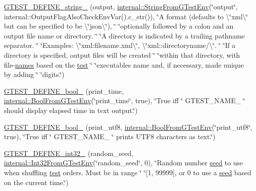 \begin{DoxyCompactItemize}
\mbox{\hyperlink{namespacetesting_a540064257c7d8030f84b886bc519aaf8}{G\+T\+E\+S\+T\+\_\+\+D\+E\+F\+I\+N\+E\+\_\+string\+\_\+}} (output, \mbox{\hyperlink{namespacetesting_1_1internal_a7ed785df46a339403b0f749d3a879201}{internal\+::\+String\+From\+G\+Test\+Env}}(\char`\"{}output\char`\"{}, internal\+::\+Output\+Flag\+Also\+Check\+Env\+Var().c\+\_\+str()), \char`\"{}A format (defaults to \textbackslash{}\char`\"{}xml\textbackslash{}\char`\"{} but can be specified to be \textbackslash{}\char`\"{}json\textbackslash{}\char`\"{}), \char`\"{} \char`\"{}optionally followed by a colon and an output file name or directory. \char`\"{} \char`\"{}A directory is indicated by a trailing pathname separator. \char`\"{} \char`\"{}Examples\+: \textbackslash{}\char`\"{}xml\+:filename.\+xml\textbackslash{}\char`\"{}, \textbackslash{}\char`\"{}xml\+::directoryname/\textbackslash{}\char`\"{}. \char`\"{} \char`\"{}If a directory is specified, output files will be created \char`\"{} \char`\"{}within that directory, with file-\/\mbox{\hyperlink{_mutual_8h_a78a6dba1026eca68e2950c3857634cb3}{names}} based on the \mbox{\hyperlink{_mutual_8h_a707ee03719e99670bf6cfdfd897b8456}{test}} \char`\"{} \char`\"{}executable\textquotesingle{}s name and, if necessary, made unique by adding \char`\"{} \char`\"{}digits.\char`\"{})
\item 
\mbox{\hyperlink{namespacetesting_a766fcba2ec951940e528276919a5d22f}{G\+T\+E\+S\+T\+\_\+\+D\+E\+F\+I\+N\+E\+\_\+bool\+\_\+}} (print\+\_\+time, \mbox{\hyperlink{namespacetesting_1_1internal_a67132cdce23fb71b6c38ee34ef81eb4c}{internal\+::\+Bool\+From\+G\+Test\+Env}}(\char`\"{}print\+\_\+time\char`\"{}, true), \char`\"{}True iff \char`\"{} G\+T\+E\+S\+T\+\_\+\+N\+A\+M\+E\+\_\+ \char`\"{} should display elapsed time in text output.\char`\"{})
\item 
\mbox{\hyperlink{namespacetesting_afdae92a76b2682c4d2ff524813bdfedf}{G\+T\+E\+S\+T\+\_\+\+D\+E\+F\+I\+N\+E\+\_\+bool\+\_\+}} (print\+\_\+utf8, \mbox{\hyperlink{namespacetesting_1_1internal_a67132cdce23fb71b6c38ee34ef81eb4c}{internal\+::\+Bool\+From\+G\+Test\+Env}}(\char`\"{}print\+\_\+utf8\char`\"{}, true), \char`\"{}True iff \char`\"{} G\+T\+E\+S\+T\+\_\+\+N\+A\+M\+E\+\_\+ \char`\"{} prints U\+T\+F8 characters as text.\char`\"{})
\item 
\mbox{\hyperlink{namespacetesting_a9900d8db2670a26999fbc2a9130f7185}{G\+T\+E\+S\+T\+\_\+\+D\+E\+F\+I\+N\+E\+\_\+int32\+\_\+}} (random\+\_\+seed, \mbox{\hyperlink{namespacetesting_1_1internal_a0f7e728793f9e6cb0aa2b69eaa468bf3}{internal\+::\+Int32\+From\+G\+Test\+Env}}(\char`\"{}random\+\_\+seed\char`\"{}, 0), \char`\"{}Random number \mbox{\hyperlink{_input_8h_af0f2cc4946f88de776f7ffa35e382fcb}{seed}} to use when shuffling \mbox{\hyperlink{_mutual_8h_a707ee03719e99670bf6cfdfd897b8456}{test}} orders.  Must be in range \char`\"{} \char`\"{}\mbox{[}1, 99999\mbox{]}, or 0 to use a \mbox{\hyperlink{_input_8h_af0f2cc4946f88de776f7ffa35e382fcb}{seed}} based on the current time.\char`\"{})

\end{DoxyCompactItemize}
